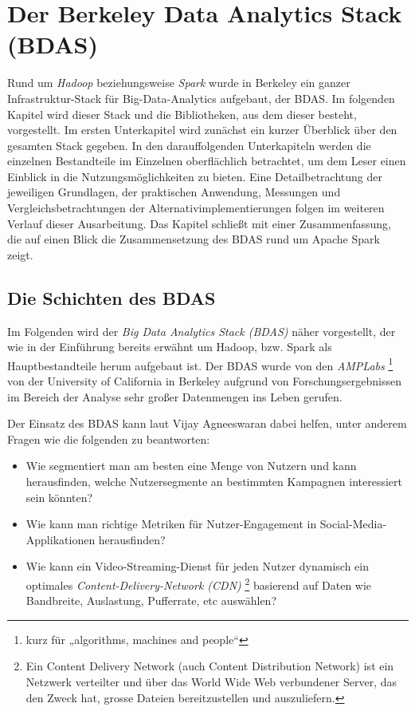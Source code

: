 \chapter{Der Berkeley Data Analytics Stack (BDAS)}
\label{chapter:grundlagen des BDAS}


Rund um \textit{Hadoop} beziehungsweise \textit{Spark} wurde in Berkeley ein ganzer Infrastruktur-Stack für Big-Data-Analytics aufgebaut, der BDAS. Im folgenden Kapitel wird dieser Stack und die Bibliotheken, aus dem dieser besteht, vorgestellt. Im ersten Unterkapitel wird zunächst ein kurzer Überblick über den gesamten Stack gegeben. In den darauffolgenden Unterkapiteln werden die einzelnen Bestandteile im Einzelnen oberflächlich betrachtet, um dem Leser einen Einblick in die Nutzungsmöglichkeiten zu bieten. Eine Detailbetrachtung der jeweiligen Grundlagen, der praktischen Anwendung, Messungen und Vergleichsbetrachtungen der Alternativimplementierungen folgen im weiteren Verlauf dieser Ausarbeitung. Das Kapitel schließt mit einer Zusammenfassung, die auf einen Blick die Zusammensetzung des BDAS rund um Apache Spark zeigt. 


\section{Die Schichten des BDAS}
\label{section:schichten des BDAS}

	
	Im Folgenden wird der \textit{Big Data Analytics Stack (BDAS)} näher vorgestellt, der wie in der Einführung bereits erwähnt um Hadoop, bzw. Spark als Hauptbestandteile herum aufgebaut ist. Der BDAS wurde von den \textit{AMPLabs} \footnote{kurz für „algorithms, machines and people“} von der University of California in Berkeley aufgrund von Forschungsergebnissen im Bereich der Analyse sehr großer Datenmengen ins Leben gerufen. 

Der Einsatz des BDAS kann laut Vijay Agneeswaran  dabei helfen, unter anderem Fragen wie die folgenden zu beantworten: 

\begin{itemize}
		\item Wie segmentiert man am besten eine Menge von Nutzern und kann herausfinden, welche Nutzersegmente an bestimmten Kampagnen interessiert sein könnten?
		\item Wie kann man richtige Metriken für Nutzer-Engagement in Social-Media-Applikationen herausfinden?
		\item Wie kann ein Video-Streaming-Dienst für jeden Nutzer dynamisch ein optimales \textit{Content-Delivery-Network (CDN)} \footnote{Ein Content Delivery Network (auch Content Distribution Network) ist ein Netzwerk verteilter und über das World Wide Web verbundener Server, das den Zweck hat, grosse Dateien bereitzustellen und auszuliefern.} basierend auf Daten wie Bandbreite, Auslastung, Pufferrate, etc auswählen?
		
\end{itemize}	


